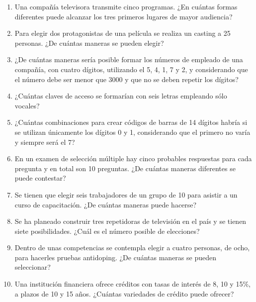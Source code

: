 \begin{Ejer}
\begin{enumerate}
\item Una compa\~n\'ia televisora transmite cinco programas. ¿En cu\'antas formas diferentes puede alcanzar los tres primeros lugares de mayor audiencia?

\item Para elegir dos protagonistas de una pel\'icula se realiza un casting a 25 personas. ¿De cu\'antas maneras se pueden elegir?

\item ¿De cu\'antas maneras ser\'ia posible formar los n\'umeros de empleado de una compa\~n\'ia, con cuatro d\'igitos, utilizando el 5, 4, 1, 7 y 2, y considerando que el n\'umero debe ser menor que 3000 y que no se deben repetir los d\'igitos?

\item ¿Cu\'antas claves de acceso se formar\'ian con seis letras empleando s\'olo vocales?

\item ¿Cu\'antas combinaciones para crear c\'odigos de barras de 14 d\'igitos habr\'ia si se utilizan \'unicamente los d\'igitos 0 y 1, considerando que el primero no var\'ia y siempre ser\'a el 7?

\item En un examen de selecci\'on m\'ultiple hay cinco probables respuestas para cada pregunta y en total son 10 preguntas. ¿De cu\'antas maneras diferentes se puede contestar?

\item Se tienen que elegir seis trabajadores de un grupo de 10 para asistir a un curso de capacitaci\'on. ¿De cu\'antas maneras puede hacerse?

\item Se ha planeado construir tres repetidoras de televisi\'on en el pa\'is y se tienen siete posibilidades. ¿Cu\'al es el n\'umero posible de elecciones?

\item Dentro de unas competencias se contempla elegir a cuatro personas, de ocho, para hacerles pruebas antidoping. ¿De cu\'antas maneras se pueden seleccionar?

\item Una instituci\'on financiera ofrece cr\'editos con tasas de inter\'es de 8, 10 y 15\%, a plazos de 10 y 15 a\~nos. ¿Cu\'antas variedades de cr\'edito puede ofrecer?

\end{enumerate}
\end{Ejer}

